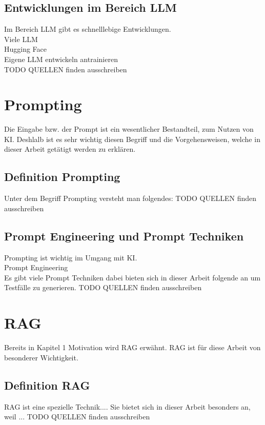 \documentclass[12pt,toc=bib,toc=listof]{scrreprt}
\begin{document}
\subsection{Entwicklungen im Bereich LLM} %
\label{sec:entwicklungenImBereichLLM}
Im Bereich LLM gibt es schnelllebige Entwicklungen.\\
Viele LLM\\
Hugging Face\\
Eigene LLM entwickeln antrainieren\\
TODO QUELLEN finden ausschreiben

\section{Prompting} %
\label{sec:prompting}
Die Eingabe bzw. der Prompt ist ein wesentlicher Bestandteil, zum Nutzen von KI. Deshlalb ist es sehr wichtig diesen Begriff und die Vorgehensweisen, welche in dieser Arbeit getätigt werden zu erklären.

\subsection{Definition Prompting} %
\label{sec:definitionPrompting}
Unter dem Begriff Prompting versteht man folgendes:
TODO QUELLEN finden ausschreiben

\subsection{Prompt Engineering und Prompt Techniken} %
\label{sec:promptEngineeringUndPromptTechniken}
Prompting ist wichtig im Umgang mit KI.\\
Prompt Engineering\\
Es gibt viele Prompt Techniken dabei bieten sich in dieser Arbeit folgende an um Testfälle zu generieren.
TODO QUELLEN finden ausschreiben

\section{RAG} %
\label{sec:rag}
Bereits in Kapitel 1 Motivation wird RAG erwähnt. RAG ist für diese Arbeit von besonderer Wichtigkeit. 

\subsection{Definition RAG} %
\label{sec:definitionRAG}
RAG ist eine spezielle Technik.... Sie bietet sich in dieser Arbeit besonders an, weil ...
TODO QUELLEN finden ausschreiben
\end{document}
